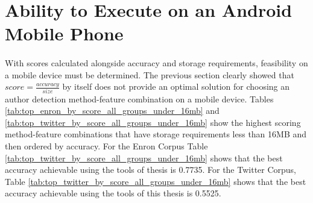 \section{Ability to Execute on an Android Mobile Phone}
\paragraph*{} With scores calculated alongside accuracy and storage requirements, feasibility on a mobile device must be determined.  The previous section clearly showed that $score = \frac{accuracy}{size}$ by itself does not provide an optimal solution for choosing an author detection method-feature combination on a mobile device. Tables \ref{tab:top_enron_by_score_all_groups_under_16mb} and \ref{tab:top_twitter_by_score_all_groups_under_16mb} show the highest scoring method-feature combinations that have storage requirements less than 16MB and then ordered by accuracy.  For the Enron Corpus Table \ref{tab:top_twitter_by_score_all_groups_under_16mb} shows that the best accuracy achievable using the tools of thesis is 0.7735.  For the Twitter Corpus, Table \ref{tab:top_twitter_by_score_all_groups_under_16mb} shows that the best accuracy achievable using the tools of this thesis is 0.5525. 

